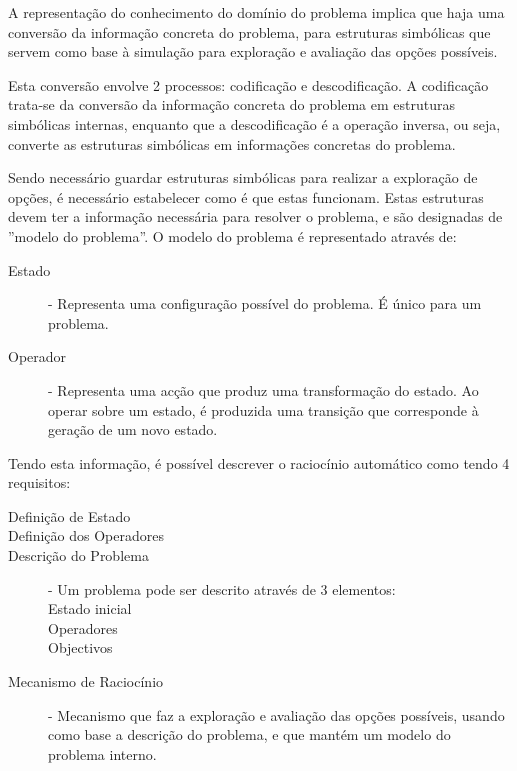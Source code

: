 \documentclass[a4paper,12pt]{article}
\begin{document}
A representação do conhecimento do domínio do problema implica que haja uma conversão da informação concreta do problema, para estruturas simbólicas que servem como base à simulação para exploração e avaliação das opções possíveis.

Esta conversão envolve 2 processos: codificação e descodificação.
A codificação trata-se da conversão da informação concreta do problema em estruturas simbólicas internas, enquanto que a descodificação é a operação inversa, ou seja, converte as estruturas simbólicas em informações concretas do problema.

Sendo necessário guardar estruturas simbólicas para realizar a exploração de opções, é necessário estabelecer como é que estas funcionam.
Estas estruturas devem ter a informação necessária para resolver o problema, e são designadas de ''modelo do problema''. O modelo do problema é representado através de:

\begin{description}
	\item[Estado] - Representa uma configuração possível do problema. É único para um problema.
	\item[Operador] - Representa uma acção que produz uma transformação do estado. Ao operar sobre um estado, é produzida uma transição que corresponde à geração de um novo estado.
\end{description}

Tendo esta informação, é possível descrever o raciocínio automático como tendo 4 requisitos:

\begin{description}
	\item[Definição de Estado]
	\item[Definição dos Operadores]
	\item[Descrição do Problema] - Um problema pode ser descrito através de 3 elementos:\hfill \\
		Estado inicial \hfill \\
		Operadores \hfill \\
		Objectivos
	\item[Mecanismo de Raciocínio] - Mecanismo que faz a exploração e avaliação das opções possíveis, usando como base a descrição do problema, e que mantém um modelo do problema interno.
\end{description}
\end{document}
